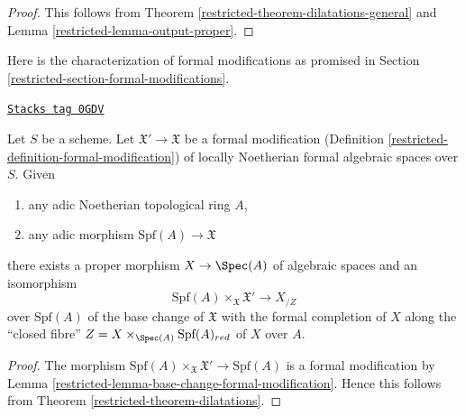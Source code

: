 \begin{proof}

This follows from Theorem \ref{restricted-theorem-dilatations-general}
and Lemma \ref{restricted-lemma-output-proper}.
\end{proof}

Here is the characterization of formal modifications
as promised in Section \ref{restricted-section-formal-modifications}.

\begin{lemma}
\label{restricted-lemma-formal-modifications-locally-algebraic}
\href{https://stacks.math.columbia.edu/tag/0GDV}{\texttt{Stacks tag 0GDV}}

Let $S$ be a scheme. Let $\mathfrak X' \to \mathfrak X$
be a formal modification (Definition \ref{restricted-definition-formal-modification})
of locally Noetherian formal algebraic spaces over $S$. Given
\begin{enumerate}
\item any adic Noetherian topological ring $A$,
\item any adic morphism $\text{Spf}(A) \longrightarrow \mathfrak X$
\end{enumerate}
there exists a proper morphism $X \to \Spec(A)$ of algebraic spaces
and an isomorphism
$$
\text{Spf}(A) \times_{\mathfrak X} \mathfrak X'
\longrightarrow
X_{/Z}
$$
over $\text{Spf}(A)$ of the base change of $\mathfrak X$
with the formal completion of $X$ along the ``closed fibre''
$Z = X \times_{\Spec(A)} \text{Spf}(A)_{red}$ of $X$ over $A$.
\end{lemma}

\begin{proof}

The morphism $\text{Spf}(A) \times_{\mathfrak X} \mathfrak X'
\to \text{Spf}(A)$ is a formal modification by
Lemma \ref{restricted-lemma-base-change-formal-modification}.
Hence this follows from Theorem \ref{restricted-theorem-dilatations}.
\end{proof}

